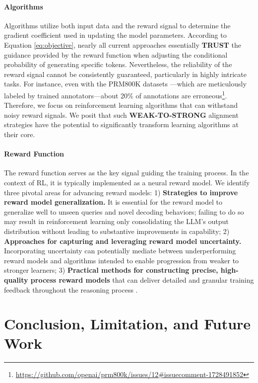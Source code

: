\begin{itemize}[topsep=0pt]
\begin{itemize}[topsep=0pt]
\paragraph{Algorithms} Algorithms utilize both input data and the reward signal to determine the gradient coefficient used in updating the model parameters. According to Equation \ref{eq:objective}, nearly all current approaches essentially \textbf{TRUST} the guidance provided by the reward function when adjusting the conditional probability of generating specific tokens. Nevertheless, the reliability of the reward signal cannot be consistently guaranteed, particularly in highly intricate tasks. For instance, even with the PRM800K datasets \citep{lightman2023let}—which are meticulously labeled by trained annotators—about 20\% of annotations are erroneous\footnote{\url{https://github.com/openai/prm800k/issues/12\#issuecomment-1728491852}}. Therefore, we focus on reinforcement learning algorithms that can withstand noisy reward signals. We posit that such \textbf{WEAK-TO-STRONG} \citep{burns2023weak} alignment strategies have the potential to significantly transform learning algorithms at their core.

\paragraph{Reward Function} The reward function serves as the key signal guiding the training process. In the context of RL, it is typically implemented as a neural reward model. We identify three pivotal areas for advancing reward models: 1) \textbf{Strategies to improve reward model generalization.} It is essential for the reward model to generalize well to unseen queries and novel decoding behaviors; failing to do so may result in reinforcement learning only consolidating the LLM’s output distribution without leading to substantive improvements in capability; 2) \textbf{Approaches for capturing and leveraging reward model uncertainty.} Incorporating uncertainty can potentially mediate between underperforming reward models and algorithms intended to enable progression from weaker to stronger learners; 3) \textbf{Practical methods for constructing precise, high-quality process reward models} that can deliver detailed and granular training feedback throughout the reasoning process \citep{lightman2023let,wang2023math}.

\section{Conclusion, Limitation, and Future Work} 


\end{itemize}
\end{itemize}
